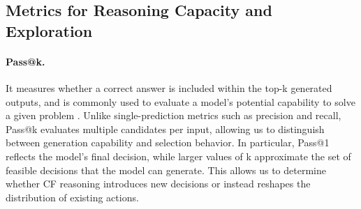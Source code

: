 \documentclass{article}
\begin{document}
\subsection{Metrics for Reasoning Capacity and Exploration}


\paragraph{Pass@k.} 
It measures whether a correct answer is included within the top-k generated outputs, and is commonly used to evaluate a model’s potential capability to solve a given problem \cite{metric:passk, limit-rlvr:does, metric:passk:example:atlas}. Unlike single-prediction metrics such as precision and recall, Pass@k evaluates multiple candidates per input, allowing us to distinguish between generation capability and selection behavior. In particular, Pass@1 reflects the model’s final decision, while larger values of k approximate the set of feasible decisions that the model can generate. This allows us to determine whether CF reasoning introduces new decisions or instead reshapes the distribution of existing actions.


\end{document}
